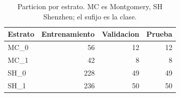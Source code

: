 \begin{table}[H]
\centering
\small
\caption{Particion por estrato. MC es Montgomery, SH Shenzhen; el sufijo es la clase.}
\begin{tabular}{lrrr}
\toprule
\textbf{Estrato} & \textbf{Entrenamiento} & \textbf{Validacion} & \textbf{Prueba} \\
\midrule
MC\_0 & 56 & 12 & 12 \\
MC\_1 & 42 & 8 & 8 \\
SH\_0 & 228 & 49 & 49 \\
SH\_1 & 236 & 50 & 50 \\
\bottomrule
\end{tabular}
\end{table}
